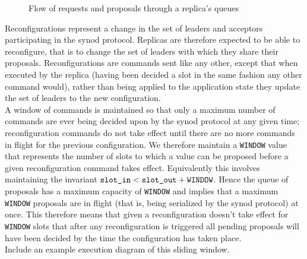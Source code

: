 \begin{figure}
  \scalebox{0.7}{
    }
  \caption{Flow of requests and proposals through a replica's queues}
  \label{fig:replica-queues}
\end{figure}
  
Reconfigurations represent a change in the set of leaders and acceptors participating in the synod protocol. Replicas are therefore expected to be able to reconfigure, that is to change the set of leaders with which they share their proposals. Reconfigurations are commands sent like any other, except that when executed by the replica (having been decided a slot in the same fashion any other command would), rather than being applied to the application state they update the set of leaders to the new configuration. \\

A window of commands is maintained so that only a maximum number of commands are ever being decided upon by the synod protocol at any given time; reconfiguration commands do not take effect until there are no more commands in flight for the previous configuration. We therefore maintain a \texttt{WINDOW} value that represents the number of slots to which a value can be proposed before a given reconfiguration command takes effect. Equivalently this involves maintaining the invariant $ \textrm{\texttt{slot\_in}} < \textrm{\texttt{slot\_out}} + \textrm{\texttt{WINDOW}} $. Hence the queue of proposals has a maximum capacity of \texttt{WINDOW} and implies that a maximum \texttt{WINDOW} proposals are in flight (that is, being serialized by the synod protocol) at once. This therefore means that given a reconfiguration doesn't take effect for \texttt{WINDOW} slots that after any reconfiguration is triggered all pending proposals will have been decided by the time the configuration has taken place. \\

{\color{blue}Include an example execution diagram of this sliding window}.


